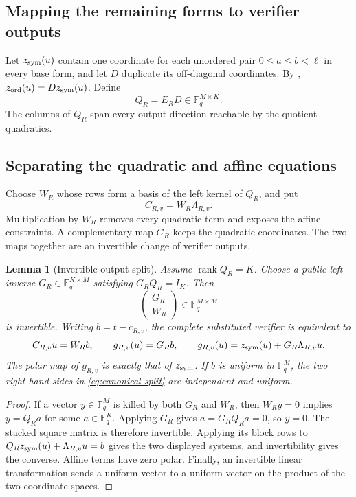 \documentclass[11pt]{article}
\newtheorem{lemma}[theorem]{Lemma}
\newcommand{\F}{\mathbb F}
\newcommand{\rank}{\operatorname{rank}}
\begin{document}
\subsection{Mapping the remaining forms to verifier outputs}
Let $z_{\rm sym}(u)$ contain one coordinate for each unordered pair
$0\le a\le b<\ell$ in every base form, and let $D$ duplicate its off-diagonal
coordinates.  By ,
$z_{\rm ord}(u)=Dz_{\rm sym}(u)$.  Define
\begin{equation}
  Q_R=E_RD\in\F_q^{M\times K}.                     \label{eq:QR}
\end{equation}
The columns of $Q_R$ span every output direction reachable by the quotient
quadratics.

\subsection{Separating the quadratic and affine equations}
Choose $W_R$ whose rows form a basis of the left kernel of $Q_R$, and put
\begin{equation}
  C_{R,v}=W_R\Lambda_{R,v}.                          \label{eq:CRv}
\end{equation}
Multiplication by $W_R$ removes every quadratic term and exposes the affine
constraints.  A complementary map $G_R$ keeps the quadratic coordinates.
The two maps together are an invertible change of verifier outputs.

\begin{lemma}[Invertible output split]\label{lem:canonical-residual}
Assume $\rank Q_R=K$.  Choose a public left inverse
$G_R\in\F_q^{K\times M}$ satisfying $G_RQ_R=I_K$.  Then
\[
 \begin{pmatrix}G_R\\W_R\end{pmatrix}\in\F_q^{M\times M}
\]
is invertible.  Writing $b=t-c_{R,v}$, the complete substituted verifier is
equivalent to
\begin{equation}
 C_{R,v}u=W_Rb,
 \qquad
 g_{R,v}(u)=G_Rb,
 \qquad
 g_{R,v}(u)=z_{\rm sym}(u)+G_R\Lambda_{R,v}u.        \label{eq:canonical-split}
\end{equation}
The polar map of $g_{R,v}$ is exactly that of $z_{\rm sym}$.  If $b$ is
uniform in $\F_q^M$, the two right-hand sides in
\eqref{eq:canonical-split} are independent and uniform.
\end{lemma}

\begin{proof}
If a vector $y\in\F_q^M$ is killed by both $G_R$ and $W_R$, then
$W_Ry=0$ implies $y=Q_Ra$ for some $a\in\F_q^K$.  Applying $G_R$ gives
$a=G_RQ_Ra=0$, so $y=0$.  The stacked square matrix is therefore invertible.
Applying its block rows to
$Q_Rz_{\rm sym}(u)+\Lambda_{R,v}u=b$ gives the two displayed systems, and
invertibility gives the converse.  Affine terms have zero polar.  Finally, an
invertible linear transformation sends a uniform vector to a uniform vector
on the product of the two coordinate spaces.
\end{proof}
\end{document}

